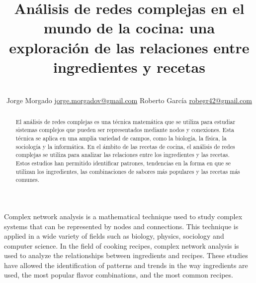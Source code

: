 \documentclass[a4paper]{article}
\title{Análisis de redes complejas en el mundo de la cocina: una exploración de
las relaciones entre ingredientes y recetas}
\author{\\
\name Jorge Morgado \email \href{mailto:jorge.morgadov@gmail.com}{jorge.morgadov@gmail.com}
	\AND
\name Roberto García \email \href{mailto:robegr42@gmail.com}{robegr42@gmail.com}
}
\begin{document}

\maketitle


\begin{abstract}

	El análisis de redes complejas es una técnica matemática que se utiliza para
	estudiar sistemas complejos que pueden ser representados mediante nodos y
	conexiones. Esta técnica se aplica en una amplia variedad de campos, como la
	biología, la física, la sociología y la informática. En el ámbito de las
	recetas de cocina, el análisis de redes complejas se utiliza para analizar
	las relaciones entre los ingredientes y las recetas. Estos estudios han
	permitido identificar patrones, tendencias en la forma en que se utilizan
	los ingredientes,  las combinaciones de sabores más populares y las recetas
	más comunes.

\end{abstract}

\vspace{0.5cm}

\begin{enabstract}

	Complex network analysis is a mathematical technique used to study complex
	systems that can be represented by nodes and connections. This technique is
	applied in a wide variety of fields such as biology, physics, sociology and
	computer science. In the field of cooking recipes, complex network analysis
	is used to analyze the relationships between ingredients and recipes. These
	studies have allowed the identification of patterns and trends in the way
	ingredients are used, the most popular flavor combinations, and the most
	common recipes.

\end{enabstract}
\end{document}

